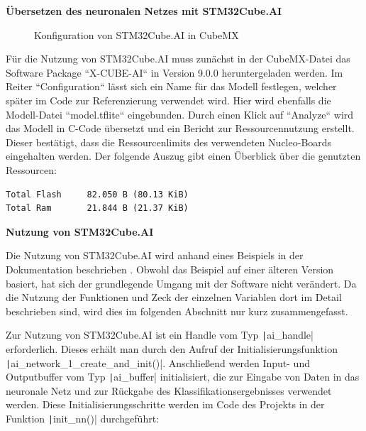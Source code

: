 \newpage
\textbf{Übersetzen des neuronalen Netzes mit STM32Cube.AI}


\begin{figure} %
	\vspace{-20pt + 0.02\textwidth}
	\hspace{0.02\textwidth} %
	\caption{Konfiguration von STM32Cube.AI in CubeMX}
	\label{fig:img-training-graph}
\end{figure}

Für die Nutzung von STM32Cube.AI muss zunächst in der CubeMX-Datei das Software Package ``X-CUBE-AI`` in Version 9.0.0 heruntergeladen werden. Im Reiter ``Configuration`` lässt sich ein Name für das Modell festlegen, welcher später im Code zur Referenzierung verwendet wird. Hier wird ebenfalls die Modell-Datei ``model.tflite`` eingebunden. Durch einen Klick auf ``Analyze`` wird das Modell in C-Code übersetzt und ein Bericht zur Ressourcennutzung erstellt. Dieser bestätigt, dass die Ressourcenlimits des verwendeten Nucleo-Boards eingehalten werden. Der folgende Auszug gibt einen Überblick über die genutzten Ressourcen:

\begin{verbatim}
Total Flash		82.050 B (80.13 KiB)
Total Ram  		21.844 B (21.37 KiB)
\end{verbatim}


\newpage
\textbf{Nutzung von STM32Cube.AI}

Die Nutzung von STM32Cube.AI wird anhand eines Beispiels in der Dokumentation beschrieben \cite{stm32-cube-ai-documentation}. Obwohl das Beispiel auf einer älteren Version basiert, hat sich der grundlegende Umgang mit der Software nicht verändert. Da die Nutzung der Funktionen und Zeck der einzelnen Variablen dort im Detail  beschrieben sind, wird dies im folgenden Abschnitt nur kurz zusammengefasst.

Zur Nutzung von STM32Cube.AI ist ein Handle vom Typ \texttt|ai_handle| erforderlich. Dieses erhält man durch den Aufruf der Initialisierungsfunktion \texttt|ai_network_1_create_and_init()|. Anschließend werden Input- und Outputbuffer vom Typ \texttt|ai_buffer| initialisiert, die zur Eingabe von Daten in das neuronale Netz und zur Rückgabe des Klassifikationsergebnisses verwendet werden. Diese Initialisierungsschritte werden im Code des Projekts in der Funktion \texttt|init_nn()| durchgeführt:


